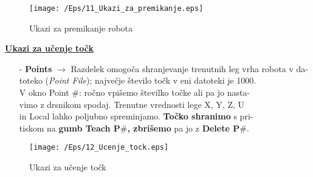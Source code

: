 
\begin{figure}[h]
    \centering
    \texttt{[image: /Eps/11\_Ukazi\_za\_premikanje.eps]}
    \vspace{-0.3cm}
    \caption{Ukazi za premikanje robota}
    \label{fUkaziPremikanjeRobota}
\end{figure}

\noindent %
\textbf{\underline{Ukazi za učenje točk}} %

\begin{enumerate}

    \item[-] \textbf{Points} $\longrightarrow$ Razdelek omogoča shranjevanje trenutnih leg vrha robota v da- \\ %
        \hspace*{1.75cm}      toteko (\emph{Point File}); največje število točk v eni datoteki je 1000.\\ %
        \hspace*{1.75cm}      V okno Point $\#$: ročno vpišemo številko točke ali pa jo nasta- \\ %
        \hspace*{1.75cm}      vimo z drsnikom spodaj. Trenutne vrednosti lege  X, Y, Z, U \\ %
        \hspace*{1.75cm}       in Local lahko poljubno spreminjamo. \textbf{Točko shranimo} s pri- \\ %
        \hspace*{1.75cm}      tiskom na \textbf{gumb Teach P$\#$, zbrišemo} pa jo z \textbf{Delete P$\#$}. \\%

\end{enumerate}

\begin{figure}[h]
    \centering
    \texttt{[image: /Eps/12\_Ucenje\_tock.eps]}
    \vspace{-0.3cm}
    \caption{Ukazi za učenje točk}
    \label{fUkaziUcenjeTock}
\end{figure}


